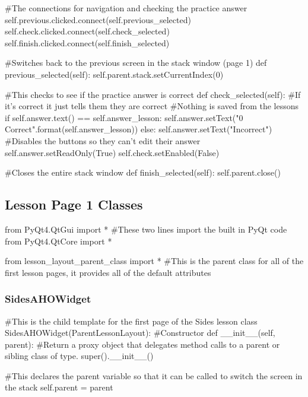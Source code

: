 \begin{landscape}
\begin{python}
        #The connections for navigation and checking the practice answer
        self.previous.clicked.connect(self.previous_selected)
        self.check.clicked.connect(self.check_selected)
        self.finish.clicked.connect(self.finish_selected)

    #Switches back to the previous screen in the stack window (page 1)
    def previous_selected(self):
        self.parent.stack.setCurrentIndex(0)

    #This checks to see if the practice answer is correct
    def check_selected(self):
        #If it's correct it just tells them they are correct
        #Nothing is saved from the lessons
        if self.answer.text() == self.answer_lesson:
            self.answer.setText("{0} Correct".format(self.answer_lesson))
        else:
            self.answer.setText("Incorrect")
        #Disables the buttons so they can't edit their answer
        self.answer.setReadOnly(True)
        self.check.setEnabled(False)

    #Closes the entire stack window
    def finish_selected(self):
        self.parent.close()
\end{python}

\subsection{Lesson Page 1 Classes}

\begin{python}
from PyQt4.QtGui import * #These two lines import the built in PyQt code
from PyQt4.QtCore import *

from lesson_layout_parent_class import * #This is the parent class for all of the first lesson pages, it provides all of the default attributes
\end{python}

\subsubsection{SidesAHOWidget}

\begin{python}
#This is the child template for the first page of the Sides lesson
class SidesAHOWidget(ParentLessonLayout):
    #Constructor
    def __init__(self, parent):
        #Return a proxy object that delegates method calls to a parent or sibling class of type.
        super().__init__()

        #This declares the parent variable so that it can be called to switch the screen in the stack
        self.parent = parent


\end{python}
\end{landscape}
